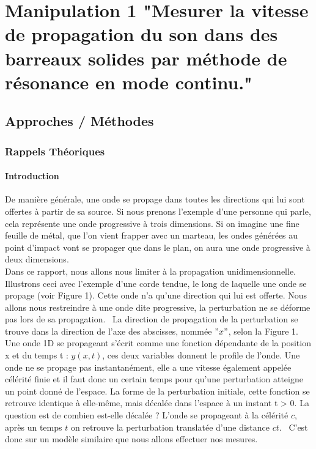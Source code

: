 \section{Manipulation 1 "Mesurer la vitesse de propagation du son dans des
barreaux solides par méthode de résonance en mode continu."}
\subsection{\large Approches / Méthodes}
\subsubsection{\large Rappels Théoriques}

\paragraph{Introduction}
De manière générale, une onde se propage dans toutes les directions
qui lui sont offertes à partir de sa source. Si nous prenons l'exemple
d'une personne qui parle, cela représente une onde progressive à trois 
dimensions. Si on imagine une fine feuille de métal, que l'on vient
frapper avec un marteau, les ondes générées au point d'impact vont 
se propager que dans le plan, on aura une onde progressive à deux 
dimensions. \\
Dans ce rapport, nous allons nous limiter à la propagation 
unidimensionnelle.
Illustrons ceci avec l'exemple d'une corde tendue, le long de 
laquelle une onde se propage (voir Figure 1). Cette onde n'a qu'une 
direction qui lui est offerte. Nous allons nous restreindre à une onde 
dite progressive, la perturbation ne se déforme pas lors de 
sa propagation.~\cite{propagation-onde}
La direction de propagation de la perturbation se trouve dans la direction
de l'axe des abscisses, nommée $"x"$, selon la Figure 1.
Une onde 1D se propageant s’écrit comme une fonction dépendante 
de la position x et du temps t : $y(x, t)$, ces deux variables donnent le 
profile de l'onde.
Une onde ne se propage pas instantanément, elle a une vitesse également appelée célérité
finie et il faut donc un certain temps pour qu’une perturbation atteigne
un point donné de l’espace.
La forme de la perturbation initiale, cette fonction se retrouve identique
à elle-même, mais décalée dans l’espace à un instant t > 0. 
La question est de combien est-elle décalée ? L’onde se propageant à la célérité $c$, 
après un temps $t$ on retrouve la perturbation translatée 
d’une distance $ct$.~\cite{propagation-onde}
C'est donc sur un modèle similaire 
que nous allons effectuer nos mesures.

